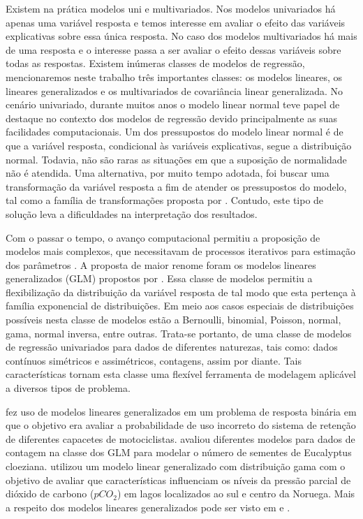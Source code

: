 Existem na prática modelos uni e multivariados. Nos modelos univariados há apenas uma variável resposta e temos interesse em avaliar o efeito das variáveis explicativas sobre essa única resposta. No caso dos modelos multivariados há mais de uma resposta e o interesse passa a ser avaliar o efeito dessas variáveis sobre todas as respostas. Existem inúmeras classes de modelos de regressão, mencionaremos neste trabalho três importantes classes: os modelos lineares, os lineares generalizados e os multivariados de covariância linear generalizada. No cenário univariado, durante muitos anos o modelo linear normal \citep{galton} teve papel de destaque no contexto dos modelos de regressão devido principalmente as suas facilidades computacionais. Um dos pressupostos do modelo linear normal é de que a variável resposta, condicional às variáveis explicativas, segue a distribuição normal. Todavia, não são raras as situações em que a suposição de normalidade não é atendida. Uma alternativa, por muito tempo adotada, foi buscar uma transformação da variável resposta a fim de atender os pressupostos do modelo, tal como a família de transformações proposta por \citet{boxcox64}. Contudo, este tipo de solução leva a dificuldades na interpretação dos resultados.

Com o passar o tempo, o avanço computacional permitiu a proposição de modelos mais complexos, que necessitavam de processos iterativos para estimação dos parâmetros \citep{paula}. A proposta de maior renome foram os modelos lineares generalizados (GLM) propostos por \citet{Nelder72}. Essa classe de modelos permitiu a flexibilização da distribuição da variável resposta de tal modo que esta pertença à família exponencial de distribuições. Em meio aos casos especiais de distribuições possíveis nesta classe de modelos estão a Bernoulli, binomial, Poisson, normal, gama, normal inversa, entre outras. Trata-se portanto, de uma classe de modelos de regressão univariados para dados de diferentes naturezas, tais como: dados contínuos simétricos e assimétricos, contagens, assim por diante. Tais características tornam esta classe uma flexível ferramenta de modelagem aplicável a diversos tipos de problema. 

\citet{capacete} fez uso de modelos lineares generalizados em um problema de resposta binária em que o objetivo era avaliar a probabilidade de uso incorreto do sistema de retenção de diferentes capacetes de motociclistas. \citet{euc} avaliou diferentes modelos para dados de contagem na classe dos GLM para modelar o número de sementes de Eucalyptus cloeziana. \citet{pco2} utilizou um modelo linear generalizado com distribuição gama com o objetivo de avaliar que características influenciam os níveis da pressão parcial de dióxido de carbono ($pCO_2$) em lagos localizados ao sul e centro da Noruega. Mais a respeito dos modelos lineares generalizados pode ser visto em \citet{paula} e \citet{cordeiro}.

